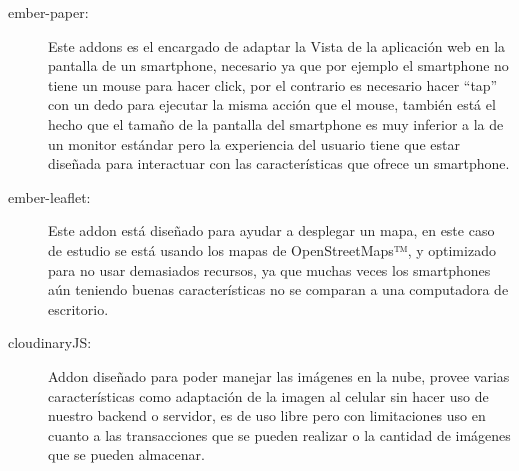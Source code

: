 \begin{description}
\item[ember-paper:] Este addons es el encargado de adaptar la Vista de la aplicación web en la pantalla de un smartphone, necesario ya que por ejemplo el smartphone no tiene un mouse para hacer click, por el contrario es necesario hacer “tap” con un dedo para ejecutar la misma acción que el mouse, también está el hecho que el tamaño de la pantalla del smartphone es muy inferior a la de un monitor estándar pero la experiencia del usuario tiene que estar diseñada para interactuar con las características que ofrece un smartphone.

\item[ember-leaflet:] Este addon está diseñado para ayudar a desplegar un mapa, en este caso de estudio se está usando los mapas de OpenStreetMaps™, y optimizado para no usar demasiados recursos, ya que muchas veces los smartphones aún teniendo buenas características no se comparan a una computadora de escritorio.

\item[cloudinaryJS:] Addon diseñado para poder manejar las imágenes en la nube, provee varias características como adaptación de la imagen al celular sin hacer uso de nuestro backend o servidor, es de uso libre pero con limitaciones uso en cuanto a las transacciones que se pueden realizar o la cantidad de imágenes que se pueden almacenar.

\end{description}



